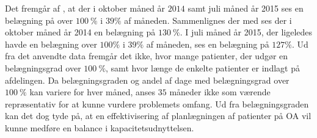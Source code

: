 \noindent
Det fremgår af , at der i oktober måned år $2014$ samt juli måned år 2015 ses en belægning på over $100~\%$ i $39\%$ af måneden. Sammenlignes der med  ses der i oktober måned år 2014 en belægning på $130~\%$. I juli måned år 2015, der ligeledes havde en belægning over $100\%$ i $39\%$ af måneden, ses en belægning på $127\%$. 
Ud fra det anvendte data fremgår det ikke, hvor mange patienter, der udgør en belægningsgrad over $100~\%$, samt hvor længe de enkelte patienter er indlagt på afdelingen. Da belægningsgraden og andel af dage med belægningsgrad over $100~\%$ kan variere for hver måned, anses $35$ måneder ikke som værende repræsentativ for at kunne vurdere problemets omfang. Ud fra belægningsgraden kan det dog tyde på, at en effektivisering af planlægningen af patienter på OA vil kunne medføre en balance i kapacitetsudnyttelsen.
